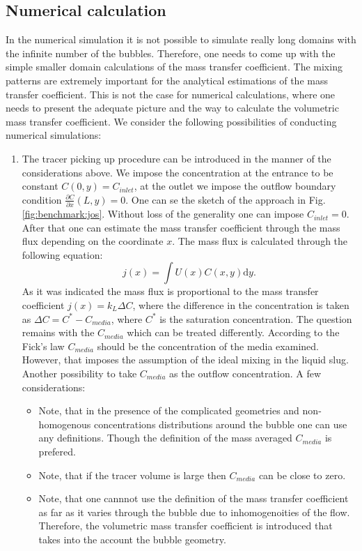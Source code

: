 \documentclass{article}
\newcommand{\beq}{\begin{equation}}
\newcommand{\feq}{\end{equation}}
\begin{document}
\subsection{Numerical calculation}
In the numerical simulation it is not possible to simulate really long domains with the infinite
number of the bubbles. Therefore, one needs to come up with the simple smaller domain calculations
of the mass transfer coefficient. The mixing patterns are extremely important for the analytical
estimations of the mass transfer coefficient. This is not the case for numerical calculations,
where one needs to present the adequate picture and the way to calculate the volumetric mass
transfer coefficient. We consider the following possibilities of conducting numerical simulations:
\begin{enumerate}
 \item The tracer picking up procedure can be introduced in the manner of the considerations above.
We impose the concentration at the entrance to be constant $C(0,y)=C_{inlet}$, at the outlet we
impose the outflow boundary condition $\frac{\partial C}{\partial x}(L,y)=0$. One can se the sketch
of the approach in Fig. \ref{fig:benchmark:jos}. Without loss of the generality one can impose
$C_{inlet}=0$. After that one can estimate the mass transfer coefficient through the mass flux
depending on the coordinate $x$. The mass flux is calculated through the following equation:
\beq
j(x)=\int{U(x) C(x,y) \mathrm{d}y}.
\feq
As it was indicated the mass flux is proportional to the mass transfer coefficient $j(x)=k_L \Delta
C$, where the difference in the concentration is taken as $\Delta C=C^{*}-C_{media}$, where $C^{*}$
is the saturation concentration. The question remains with the $C_{media}$ which can be treated
differently. According to the Fick's law $C_{media}$ should be the concentration of the media
examined. However, that imposes the assumption of the ideal mixing in the liquid slug. Another
possibility to take $C_{media}$ as the outflow concentration. A few considerations:
\begin{itemize}
 \item Note, that in the presence of the
complicated geometries and non-homogenous concentrations distributions around the bubble one can
use any definitions. Though the definition of the mass averaged $C_{media}$ is prefered.  
\item Note, that if the tracer volume is large then $C_{media}$ can be close to zero.
\item Note, that one cannnot use the definition of the mass transfer coefficient as far as it
varies through the bubble due to inhomogenoities of the flow. Therefore, the volumetric mass
transfer coefficient is introduced that takes into the account the bubble geometry.
\end{itemize}


\end{enumerate}
\end{document}

